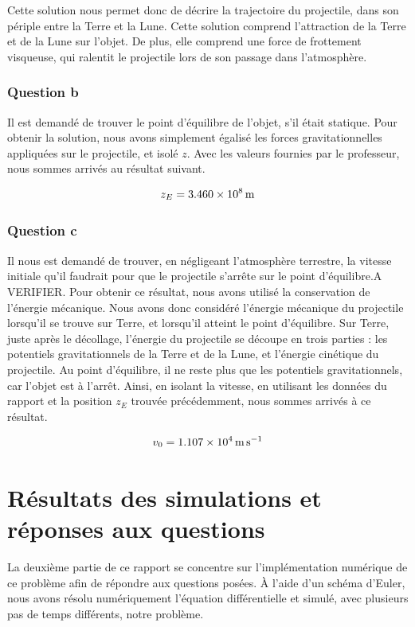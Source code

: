 \documentclass[a4paper,12pt,twoside]{article}
\begin{document}
Cette solution nous permet donc de décrire la trajectoire du projectile, dans son périple entre la Terre et la Lune.
Cette solution comprend l'attraction de la Terre et de la Lune sur l'objet.
De plus, elle comprend une force de frottement visqueuse, qui ralentit le projectile lors de son passage dans l'atmosphère.\\

\subsubsection*{Question b}
Il est demandé de trouver le point d'équilibre de l'objet, s'il était statique.
Pour obtenir la solution, nous avons simplement égalisé les forces gravitationnelles appliquées sur le projectile, et isolé $z$.
Avec les valeurs fournies par le professeur, nous sommes arrivés au résultat suivant.

\begin{equation}
    z_E = \SI{3.460d8}{\meter}
    \label{val:zE}
\end{equation}

\subsubsection*{Question c}
Il nous est demandé de trouver, en négligeant l'atmosphère terrestre, la vitesse initiale qu'il faudrait pour que le projectile s'arrête sur le point d'équilibre.A VERIFIER.
Pour obtenir ce résultat, nous avons utilisé la conservation de l'énergie mécanique.
Nous avons donc considéré l'énergie mécanique du projectile lorsqu'il se trouve sur Terre, et lorsqu'il atteint le point d'équilibre.
Sur Terre, juste après le décollage, l'énergie du projectile se découpe en trois parties :
les potentiels gravitationnels de la Terre et de la Lune, et l'énergie cinétique du projectile.
Au point d'équilibre, il ne reste plus que les potentiels gravitationnels, car l'objet est à l'arrêt.
Ainsi, en isolant la vitesse, en utilisant les données du rapport et la position $z_E$ trouvée précédemment, nous sommes arrivés à ce résultat.

\begin{equation}
    v_0 = \SI{1.107d4}{\meter\per\second}
    \label{val:v0}
\end{equation}


\section{Résultats des simulations et réponses aux questions}
La deuxième partie de ce rapport se concentre sur l'implémentation numérique de ce problème afin de répondre aux questions posées.
À l'aide d'un schéma d'Euler, nous avons résolu numériquement l'équation différentielle et simulé, avec plusieurs pas de temps différents, notre problème.
\end{document}
